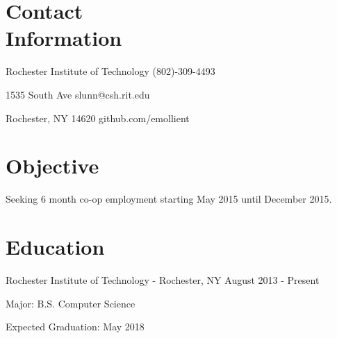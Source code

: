 \documentclass[a4paper,margin,line]{resume}
\newcommand{\rdate}[1]{\hfill {\small #1}}
\begin{document}
\begin{resume}
\section{\mysidestyle Contact \\ Information} \vspace{2mm}
	\begin{asparablank}
		\item Rochester Institute of Technology \hfill (802)-309-4493
		\item 1535 South Ave \hfill slunn@csh.rit.edu
		\item Rochester, NY 14620 \hfill github.com/emollient
	\end{asparablank}

\section{\mysidestyle Objective}
	\begin{asparablank}
    	\item Seeking 6 month co-op employment starting May 2015 until December
        2015.
	\end{asparablank}

\section{\mysidestyle Education}
	\begin{compactdesc}
		\item[Rochester Institute of Technology] - Rochester, NY \rdate{August 2013 - Present}
		\begin{asparablank} { \small
			\item Major: B.S. Computer Science
		} \end{asparablank}
		\begin{asparablank} { \small
			\item Expected Graduation: May 2018
		} \end{asparablank}
	\end{compactdesc}


\end{resume}
\end{document}
